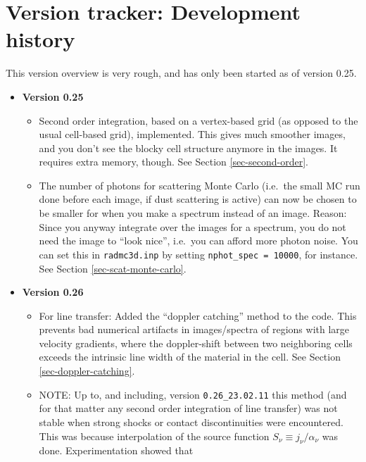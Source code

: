 \documentclass{report}
\begin{document}
\chapter{Version tracker: Development history}
\label{chap-development-history}
%
This version overview is very rough, and has only been started as of version
0.25.
\begin{itemize}
\item {\bf Version 0.25}
\begin{itemize}
  \item Second order integration, based on a vertex-based grid (as opposed to 
    the usual cell-based grid), implemented. This gives much smoother images,
    and you don't see the blocky cell structure anymore in the images. It 
    requires extra memory, though. See Section \ref{sec-second-order}.
  \item The number of photons for scattering Monte Carlo (i.e.\ the small MC
    run done before each image, if dust scattering is active) can now be
    chosen to be smaller for when you make a spectrum instead of an
    image. Reason: Since you anyway integrate over the images for a
    spectrum, you do not need the image to ``look nice'', i.e.\ you can
    afford more photon noise. You can set this in {\small\tt radmc3d.inp} by
    setting {\small\tt nphot\_spec = 10000}, for instance. See Section
    \ref{sec-scat-monte-carlo}.
\end{itemize}
\item {\bf Version 0.26}
  \begin{itemize}
  \item For line transfer: Added the ``doppler catching'' method to the
    code. This prevents bad numerical artifacts in images/spectra of regions
    with large velocity gradients, where the doppler-shift between two
    neighboring cells exceeds the intrinsic line width of the material in
    the cell. See Section \ref{sec-doppler-catching}. 
  \item NOTE: Up to, and including, version {\small\tt 0.26\_23.02.11} this
    method (and for that matter any second order integration of line
    transfer) was not stable when strong shocks or contact discontinuities
    were encountered. This was because interpolation of the source function
    $S_\nu\equiv j_\nu/\alpha_\nu$ was done. Experimentation showed that

\end{itemize}
\end{itemize}
\end{document}
